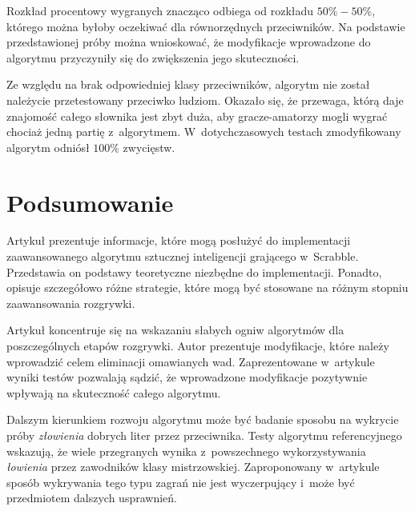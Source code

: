 \documentclass[a4paper,twocolumn,12pt]{article}
\theoremstyle{definition}
\begin{document}
Rozkład procentowy wygranych znacząco odbiega od rozkładu $50\% - 50\%$, którego można byłoby oczekiwać dla równorzędnych przeciwników. Na podstawie przedstawionej próby można wnioskować, że modyfikacje wprowadzone do algorytmu przyczyniły się do zwiększenia jego skuteczności.

Ze względu na brak odpowiedniej klasy przeciwników, algorytm nie został należycie przetestowany przeciwko ludziom. Okazało się, że przewaga, którą daje znajomość całego słownika jest zbyt duża, aby gracze-amatorzy mogli wygrać chociaż jedną partię z~algorytmem. W~dotychczasowych testach zmodyfikowany algorytm odniósł $100\%$ zwycięstw.

\section*{Podsumowanie}

Artykuł prezentuje informacje, które mogą posłużyć do implementacji zaawansowanego algorytmu sztucznej inteligencji grającego w~Scrabble. Przedstawia on podstawy teoretyczne niezbędne do implementacji. Ponadto, opisuje szczegółowo różne strategie, które mogą być stosowane na różnym stopniu zaawansowania rozgrywki. 

Artykuł koncentruje się na wskazaniu słabych ogniw algorytmów dla poszczególnych etapów rozgrywki. Autor prezentuje modyfikacje, które należy wprowadzić celem eliminacji omawianych wad. Zaprezentowane w~artykule wyniki testów pozwalają sądzić, że wprowadzone modyfikacje pozytywnie wpływają na skuteczność całego algorytmu. 

Dalszym kierunkiem rozwoju algorytmu może być badanie sposobu na wykrycie próby \emph{złowienia} dobrych liter przez przeciwnika. Testy algorytmu referencyjnego wskazują, że wiele przegranych wynika z~powszechnego wykorzystywania \emph{łowienia} przez zawodników klasy mistrzowskiej. Zaproponowany w~artykule sposób wykrywania tego typu zagrań nie jest wyczerpujący i~może być przedmiotem dalszych usprawnień.
\end{document}
